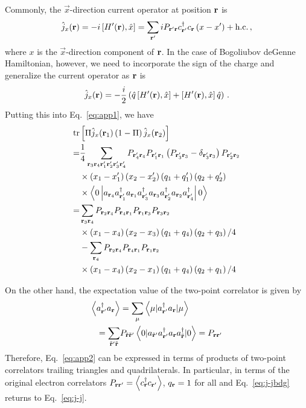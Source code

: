 \documentclass[amsmath,amssymb, aps, prx, longbibliography, twocolumn]{revtex4-1}
\begin{document}
Commonly, the $\vec{x}$-direction current operator at position ${\bf r}$ is 
\[
	\hat{j}_x({\bf r})=-i\left[H'({\bf r}),\hat x\right]=\sum_{{\bf r}'}iP_{{\bf r}'{\bf r}}c_{{\bf r}'}^\dagger c_{{\bf r}}\left(x-x'\right)+\mbox{h.c.} \,,
\]
where $x$ is the $\vec{x}$-direction component of ${\bf r}$. In the case of Bogoliubov deGenne Hamiltonian, however, we need to incorporate the sign of the charge and generalize the current operator as ${\bf r}$ is 
\[
	\hat{j}_x({\bf r})=-\frac{i}{2}\left(\hat{q}\left[H'({\bf r}),\hat x\right]+\left[H'({\bf r}),\hat x\right]\hat{q}\right) \,.
\] 
Putting this into Eq.~\eqref{eq:app1}, we have 
\begin{equation}
\left.
\begin{aligned}
\mbox{tr}&\left[\Pi \hat{j}_x({\bf r}_1) \left(1-\Pi\right) \hat{j}_x({\bf r}_2)\right]  \\
=& \frac{1}{4} \sum_{{\bf r}_3 {\bf r}_4 {\bf r}'_1 {\bf r}'_2{\bf r}'_3{\bf r}'_4}P_{{\bf r}'_4 {\bf r}_4}P_{{\bf r}'_1{\bf r}_1}\left(P_{{\bf r}'_3{\bf r}_3}-\delta_{{\bf r}'_3{\bf r}_3}\right)P_{{\bf r}'_2{\bf r}_2} \\&\times\left(x_1-x'_1\right)\left(x_2-x'_2\right)\left(q_1+q'_1\right)\left(q_2+q'_2\right)
\\&\times\left\langle0\left|a_{{\bf r}_4}a^\dagger_{{\bf r}'_1} a_{{\bf r}_1} a^\dagger_{{\bf r}'_3} a_{{\bf r}_3} a^\dagger_{{\bf r}'_2} a_{{\bf r}_2} a^\dagger_{{\bf r}'_4}\right|0\right\rangle \\
=& \sum_{{\bf r}_3 {\bf r}_4}P_{{\bf r}_2 {\bf r}_4}P_{{\bf r}_4{\bf r}_1}P_{{\bf r}_1{\bf r}_3}P_{{\bf r}_3{\bf r}_2}\\
&\times\left(x_1-x_4\right)\left(x_2-x_3\right)\left(q_1+q_4\right)\left(q_2+q_3\right)/4 \\
 &- \sum_{{\bf r}_4}P_{{\bf r}_2 {\bf r}_4}P_{{\bf r}_4{\bf r}_1}P_{{\bf r}_1{\bf r}_2}\\
 &\times\left(x_1-x_4\right)\left(x_2-x_1\right)\left(q_1+q_4\right)\left(q_2+q_1\right)/4
\label{eq:app2}\end{aligned}\right.
\end{equation}

On the other hand, the expectation value of the two-point correlator is given by
\begin{equation}
\left. \begin{aligned}
\left\langle a_{{\bf r}'}^{\dagger}a_{{\bf r}}\right\rangle  &= \sum_{\mu}\left\langle \mu|a_{{\bf r}'}^{\dagger}a_{{\bf r}}|\mu\right\rangle \\
  =\sum_{\tilde{{\bf r}}' \tilde{{\bf r}}}&P_{\tilde{{\bf r}}\tilde{{\bf r}}'}\left\langle 0|a_{\tilde{{\bf r}}'}a_{{\bf r}'}^{\dagger}a_{{\bf r}}a_{\tilde{{\bf r}}}^{\dagger}|0\right\rangle  =P_{{\bf r}{\bf r}'}
\end{aligned}\right. 
\label{eq:j-jbdg}
\end{equation}
Therefore, Eq.~\eqref{eq:app2} can be expressed in terms of products of two-point correlators trailing triangles and quadrilaterals. In particular, in terms of the original electron correlators $P_{\bf{r}\bf{r}'}=\left\langle c^\dagger_{\bf{r}}c_{\bf{r}'} \right\rangle$, $q_{\bf{r}}=1$ for all and Eq.~\eqref{eq:j-jbdg} returns to Eq.~\eqref{eq:j-j}. 
\end{document}
